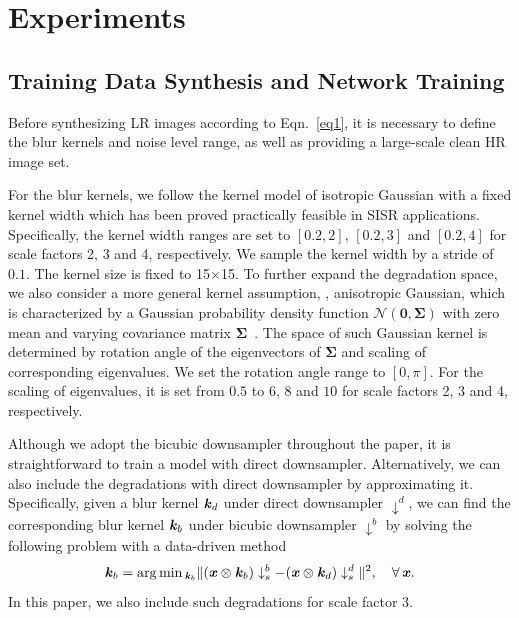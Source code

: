 \documentclass[10pt,twocolumn,letterpaper]{article}
\begin{document}
\section{Experiments}


\subsection{Training Data Synthesis and Network Training}
Before synthesizing LR images according to Eqn.~\eqref{eq1}, it is necessary to define the blur kernels and noise level range, as well as providing a large-scale clean HR image set.

For the blur kernels,
we follow the kernel model of isotropic Gaussian with a fixed kernel width which has been proved practically feasible in SISR applications.
Specifically, the kernel width ranges are set to $[0.2, 2]$, $[0.2, 3]$ and $[0.2, 4]$ for scale factors 2, 3 and 4, respectively.
We sample the kernel width by a stride of $0.1$. The kernel size is fixed to 15$\times$15.
To further expand the degradation space, we also consider a more general kernel assumption, \ie, anisotropic Gaussian, which is characterized by a
Gaussian probability density function $\mathcal{N}(\mathbf{0}, \mathbf{\Sigma})$ with zero mean and varying covariance matrix $\mathbf{\Sigma}$~\cite{riegler2015conditioned}.
The space of such Gaussian kernel is determined by rotation angle of the eigenvectors of $\mathbf{\Sigma}$ and scaling of corresponding eigenvalues.
We set the rotation angle range to $[0, \pi]$. For the scaling of eigenvalues, it is set from $0.5$ to $6$, $8$ and $10$ for scale factors 2, 3 and 4, respectively.


Although we adopt the bicubic downsampler throughout the paper, it is straightforward to train a model with direct downsampler.
Alternatively, we can also include the degradations with direct downsampler by approximating it.
Specifically, given a blur kernel $\textbf{\emph{k}}_d$ under direct downsampler $\downarrow^{d}$, we can find the corresponding
blur kernel $\textbf{\emph{k}}_b$ under bicubic downsampler $\downarrow^{b}$ by solving the following problem with a data-driven method
\begin{equation}\label{eq_td1}
  \textbf{\emph{k}}_b = \mathop{\arg\min}\displaystyle_{\textbf{\emph{k}}_b}\|(\textbf{\emph{x}} \otimes \textbf{\emph{k}}_b)\downarrow^{b}_s - (\textbf{\emph{x}} \otimes \textbf{\emph{k}}_d)\downarrow^{d}_s \|^2, \quad  \forall \, \textbf{\emph{x}}.
\end{equation}
In this paper, we also include such degradations for scale factor 3.
\end{document}
